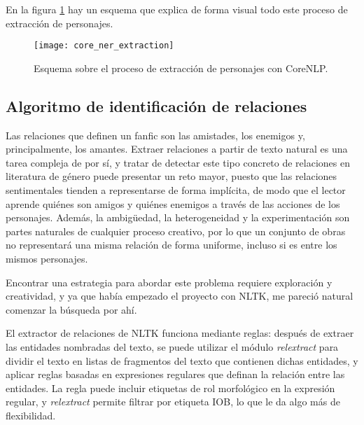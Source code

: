 \documentclass{pre-tfg}
\begin{document}
En la figura \ref{fig:ner_extraction_corenlp} hay un esquema que explica de forma visual todo este proceso de extracción de personajes.

\begin{figure}[!h]
	\centering
	\texttt{[image: core\_ner\_extraction]}
	\caption{Esquema sobre el proceso de extracción de personajes con CoreNLP.}
	\label{fig:ner_extraction_corenlp}
\end{figure}



\subsection{Algoritmo de identificación de relaciones}

Las relaciones que definen un fanfic son las amistades, los enemigos y, principalmente, los amantes. Extraer relaciones a partir de texto natural es una tarea compleja de por sí, y tratar de detectar este tipo concreto de relaciones en literatura de género puede presentar un reto mayor, puesto que las relaciones sentimentales tienden a representarse de forma implícita, de modo que el lector aprende quiénes son amigos y quiénes enemigos a través de las acciones de los personajes. Además, la ambigüedad, la heterogeneidad y la experimentación son partes naturales de cualquier proceso creativo, por lo que un conjunto de obras no representará una misma relación de forma uniforme, incluso si es entre los mismos personajes.

Encontrar una estrategia para abordar este problema requiere exploración y creatividad, y ya que había empezado el proyecto con NLTK, me pareció natural comenzar la búsqueda por ahí.

El extractor de relaciones de NLTK funciona mediante reglas: después de extraer las entidades nombradas del texto, se puede utilizar el módulo \textit{relextract} para dividir el texto en listas de fragmentos del texto que contienen dichas entidades, y aplicar reglas basadas en expresiones regulares que definan la relación entre las entidades. La regla puede incluir etiquetas de rol morfológico en la expresión regular, y \textit{relextract} permite filtrar por etiqueta IOB, lo que le da algo más de flexibilidad.
\end{document}
